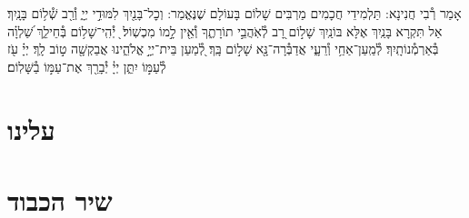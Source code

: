 \documentclass[twoside, openany, parskip=half, 11pt]{book}
\begin{document}
\vspace{-.3\baselineskip}
אָמַר רְ֯בִי חֲנִינָא: תַּלְמִידֵי חֲכָמִים מַרְבִּים שָׁלוֹם בָּעוֹלָם שֶׁנֶּאֱמַר: וְכׇל־בָּנַ֖יִךְ לִמּוּדֵ֣י יְיָ֑ וְ֯רַ֖ב שְׁ֯ל֥וֹם בָּנָֽיִךְ׃ אַל תִּקְרָא בָּנַֽיִךְ אֶלָּא בּוֹנַֽיִךְ שָׁל֣וֹם רָ֭ב לְ֯אֹֽהֲבֵ֣י תוֹרָתֶ֑ךָ וְ֯אֵ֖ין לָ֣מוֹ מִכְשֽׁוֹל׃  ֖ יְ֯הִֽי־שָׁל֥וֹם בְּ֯חֵילֵ֑ךְ שַׁ֝לְוָ֗ה בְּ֯אַרְמְ֯נוֹתָֽיִךְ׃ לְ֯מַֽעַן־אַחַ֥י וְ֯רֵעָ֑י אֲדַבְּ֯רָה־נָּ֖א שָׁל֣וֹם בָּֽךְ׃ לְ֭֯מַעַן בֵּית־יְיָ֣ אֱלֹהֵ֑ינוּ אֲבַקְשָׁ֖ה ט֣וֹב לָֽךְ׃ יְיָ֗ עֹ֖ז לְ֯עַמּ֣וֹ יִתֵּ֑ן יְיָ֓ יְ֯בָרֵ֖ךְ אֶת־עַמּ֣וֹ בַ֯שָּׁלֽוֹם׃

\rabbiskaddish

\section*{ עלינו }

\aleinu



\clearpage

\vspace{-1\baselineskip}
\section*{ שיר הכבוד }
\label{shir_shel_shabbos}
\end{document}
